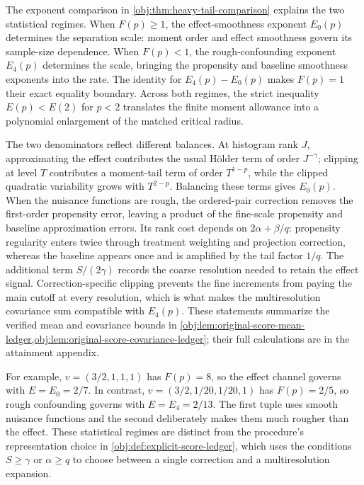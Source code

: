 The exponent comparison in \cref{obj:thm:heavy-tail-comparison} explains the two statistical regimes. When \(F(p)\ge1\), the effect-smoothness exponent \(E_0(p)\) determines the separation scale: moment order and effect smoothness govern its sample-size dependence. When \(F(p)<1\), the rough-confounding exponent \(E_4(p)\) determines the scale, bringing the propensity and baseline smoothness exponents into the rate. The identity for \(E_4(p)-E_0(p)\) makes \(F(p)=1\) their exact equality boundary. Across both regimes, the strict inequality \(E(p)<E(2)\) for \(p<2\) translates the finite moment allowance into a polynomial enlargement of the matched critical radius.

The two denominators reflect different balances. At histogram rank \(J\), approximating the effect contributes the usual Hölder term of order \(J^{-\gamma}\); clipping at level \(T\) contributes a moment-tail term of order \(T^{1-p}\), while the clipped quadratic variability grows with \(T^{2-p}\). Balancing these terms gives \(E_0(p)\). When the nuisance functions are rough, the ordered-pair correction removes the first-order propensity error, leaving a product of the fine-scale propensity and baseline approximation errors. Its rank cost depends on \(2\alpha+\beta/q\): propensity regularity enters twice through treatment weighting and projection correction, whereas the baseline appears once and is amplified by the tail factor \(1/q\). The additional term \(S/(2\gamma)\) records the coarse resolution needed to retain the effect signal. Correction-specific clipping prevents the fine increments from paying the main cutoff at every resolution, which is what makes the multiresolution covariance sum compatible with \(E_4(p)\). These statements summarize the verified mean and covariance bounds in \cref{obj:lem:original-score-mean-ledger,obj:lem:original-score-covariance-ledger}; their full calculations are in the attainment appendix.

For example, \(v=(3/2,1,1,1)\) has \(F(p)=8\), so the effect channel governs with \(E=E_0=2/7\). In contrast, \(v=(3/2,1/20,1/20,1)\) has \(F(p)=2/5\), so rough confounding governs with \(E=E_4=2/13\). The first tuple uses smooth nuisance functions and the second deliberately makes them much rougher than the effect. These statistical regimes are distinct from the procedure's representation choice in \cref{obj:def:explicit-score-ledger}, which uses the conditions \(S\ge\gamma\) or \(\alpha\ge q\) to choose between a single correction and a multiresolution expansion.

